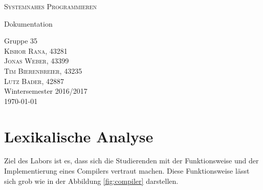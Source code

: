 \documentclass[a4paper,11pt]{report}
\begin{document}
\begin{titlepage}
\centering
\vspace*{3cm}
{
\huge \scshape Systemnahes Programmieren
}
\par
\vspace*{2cm}
{
\huge Dokumentation
}
\par
\vspace*{4cm}
{\huge Gruppe 35} \\
\vspace*{1cm}
{
\Large
\scshape
Kishor Rana, 43281 \\[1ex]
Jonas Weber, 43399 \\[1ex]
Tim Bierenbreier, 43235 \\[1ex]
Lutz Bader, 42887 \\
}
\vfill
Wintersemester 2016/2017 \\[1ex]
\today


\end{titlepage}

\setcounter{page}{2}

\tableofcontents

\chapter{Lexikalische Analyse}

Ziel des Labors ist es, dass sich die Studierenden mit der Funktionsweise und der Implementierung eines Compilers vertraut machen.
Diese Funktionsweise lässt sich grob wie in der Abbildung \ref{fig:compiler} darstellen.
\end{document}

